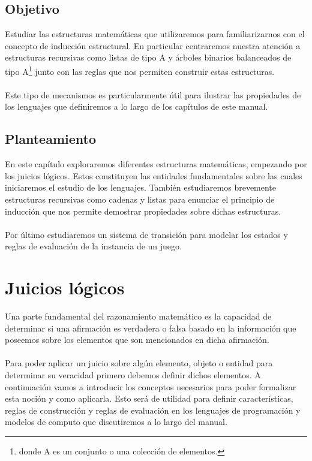 \subsection*{Objetivo}
Estudiar las estructuras matemáticas que utilizaremos para familiarizarnos con el concepto de inducción estructural. En particular centraremos nuestra atención a estructuras recursivas como listas de tipo A y árboles binarios balanceados de tipo A\footnote{donde A es un conjunto o una colección de elementos.} junto con las reglas que nos permiten construir estas estructuras.\\\\
Este tipo de mecanismos es particularmente útil para ilustrar las propiedades de los lenguajes que definiremos a lo largo de los capítulos de este manual.

\subsection*{Planteamiento}
En este capítulo exploraremos diferentes estructuras matemáticas, empezando por los juicios lógicos. Estos constituyen las entidades fundamentales sobre las cuales iniciaremos el estudio de los lenguajes.
También estudiaremos brevemente estructuras recursivas como cadenas y listas para enunciar el principio de inducción que nos permite demostrar propiedades sobre dichas estructuras.\\\\ Por último estudiaremos un sistema de transición para modelar los estados y reglas de evaluación de la instancia de un juego.

\section{Juicios lógicos}

    Una parte fundamental del razonamiento matemático es la capacidad de determinar si una afirmación es verdadera o falsa basado en la información que poseemos sobre los elementos que son mencionados en dicha afirmación. \\\\
    Para poder aplicar un juicio sobre algún elemento, objeto o entidad para determinar su veracidad primero debemos definir dichos elementos. A continuación vamos a introducir los conceptos necesarios para poder formalizar esta noción y como aplicarla. Esto será de utilidad para definir características, reglas de construcción y reglas de evaluación en los lenguajes de programación y modelos de computo que discutiremos a lo largo del manual.\\

